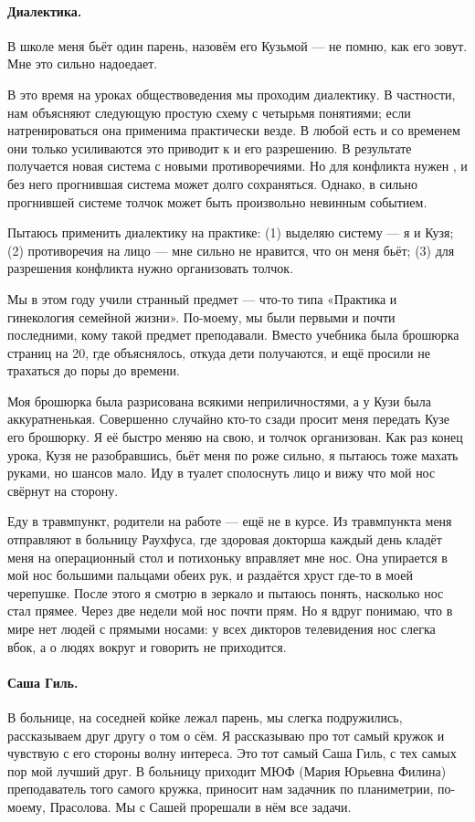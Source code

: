 \documentclass{book}
\begin{document}
\paragraph{Диалектика.}
В школе меня бьёт один парень, назовём его Кузьмой --- не помню, как его зовут.
Мне это сильно надоедает.

В это время на уроках обществоведения мы проходим диалектику.
В частности, нам объясняют следующую простую схему с четырьмя понятиями;
если натренироваться она применима практически везде.
В любой  есть  и со временем они только усиливаются это приводит к  и его разрешению.
В результате получается новая система с новыми противоречиями.
Но для конфликта нужен , 
и без него прогнившая система может долго сохраняться.
Однако, в сильно прогнившей системе толчок может быть произвольно невинным событием.

Пытаюсь применить диалектику на практике:
(1) выделяю систему --- я и Кузя;
(2) противоречия на лицо --- мне сильно не нравится, что он меня бьёт;
(3) для разрешения конфликта нужно организовать толчок.

Мы в этом году учили странный предмет --- что-то типа «Практика и гинекология семейной жизни».
По-моему, мы были первыми и почти последними, кому такой предмет преподавали.
Вместо учебника была брошюрка страниц на 20, где объяснялось, откуда дети получаются, и ещё просили не трахаться до поры до времени.

Моя брошюрка была разрисована всякими неприличностями, а у Кузи была аккуратненькая.
Совершенно случайно кто-то сзади просит меня передать Кузе его брошюрку.
Я её быстро меняю на свою, и толчок организован.
Как раз конец урока, Кузя не разобравшись, бьёт меня по роже сильно,
я пытаюсь тоже махать руками, но шансов мало.
Иду в туалет сполоснуть лицо и вижу что мой нос свёрнут на сторону.

Еду в травмпункт, родители на работе --- ещё не в курсе.
Из травмпункта меня отправляют в больницу Раухфуса,
где здоровая докторша каждый день кладёт меня на операционный стол
и потихоньку вправляет мне нос.
Она упирается в мой нос большими пальцами обеих рук, и раздаётся хруст где-то в моей черепушке.
После этого я смотрю в зеркало и пытаюсь понять, насколько нос стал прямее.
Через две недели мой нос почти прям.
Но я вдруг понимаю, что в мире нет людей с прямыми носами:
у всех дикторов телевидения нос слегка вбок, а о людях вокруг и говорить не приходится.

\paragraph{Саша Гиль.}
В больнице, на соседней койке лежал парень,
мы слегка подружились, рассказываем друг другу о том о сём.
Я рассказываю про тот самый кружок и
чувствую с его стороны волну интереса.
Это тот самый Саша Гиль, с тех самых пор мой лучший друг.
В больницу приходит МЮФ (Мария Юрьевна Филина) 
преподаватель того самого кружка,
приносит нам задачник по планиметрии, по-моему, Прасолова.
Мы с Сашей прорешали в нём все задачи.
\end{document}
